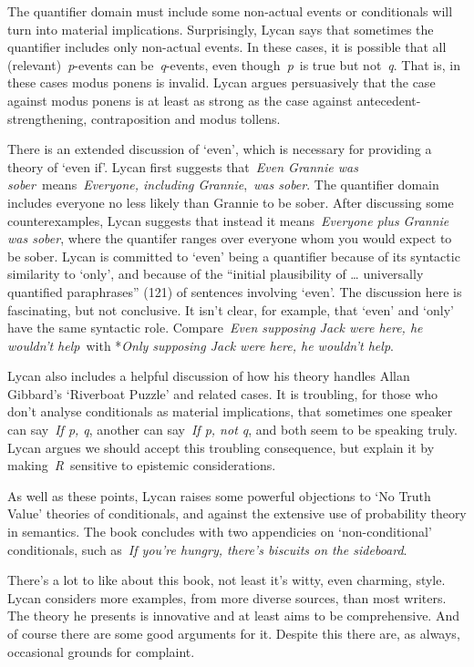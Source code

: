 \documentclass[
  10pt,
  letterpaper,
  DIV=11,
  numbers=noendperiod,
  twoside]{scrartcl}
\begin{document}
The quantifier domain must include some non-actual events or
conditionals will turn into material implications. Surprisingly, Lycan
says that sometimes the quantifier includes only non-actual events. In
these cases, it is possible that all (relevant)~\emph{p}-events can
be~\emph{q}-events, even though~\emph{p}~is true but not~\emph{q}. That
is, in these cases modus ponens is invalid. Lycan argues persuasively
that the case against modus ponens is at least as strong as the case
against antecedent-strengthening, contraposition and modus tollens.

There is an extended discussion of `even', which is necessary for
providing a theory of `even if'. Lycan first suggests that~\emph{Even
Grannie was sober}~means~\emph{Everyone, including Grannie},~\emph{was
sober}. The quantifier domain includes everyone no less likely than
Grannie to be sober. After discussing some counterexamples, Lycan
suggests that instead it means~\emph{Everyone plus Grannie was sober},
where the quantifer ranges over everyone whom you would expect to be
sober. Lycan is committed to `even' being a quantifier because of its
syntactic similarity to `only', and because of the ``initial
plausibility of \ldots{} universally quantified paraphrases'' (121) of
sentences involving `even'. The discussion here is fascinating, but not
conclusive. It isn't clear, for example, that `even' and `only' have the
same syntactic role. Compare~\emph{Even supposing Jack were here, he
wouldn't help}~with *\emph{Only supposing Jack were here, he wouldn't
help}.

Lycan also includes a helpful discussion of how his theory handles Allan
Gibbard's `Riverboat Puzzle' and related cases. It is troubling, for
those who don't analyse conditionals as material implications, that
sometimes one speaker can say~\emph{If p, q}, another can say~\emph{If
p, not q}, and both seem to be speaking truly. Lycan argues we should
accept this troubling consequence, but explain it by
making~\emph{R}~sensitive to epistemic considerations.

As well as these points, Lycan raises some powerful objections to `No
Truth Value' theories of conditionals, and against the extensive use of
probability theory in semantics. The book concludes with two appendicies
on `non-conditional' conditionals, such as~\emph{If you're hungry,
there's biscuits on the sideboard}.

There's a lot to like about this book, not least it's witty, even
charming, style. Lycan considers more examples, from more diverse
sources, than most writers. The theory he presents is innovative and at
least aims to be comprehensive. And of course there are some good
arguments for it. Despite this there are, as always, occasional grounds
for complaint.
\end{document}
